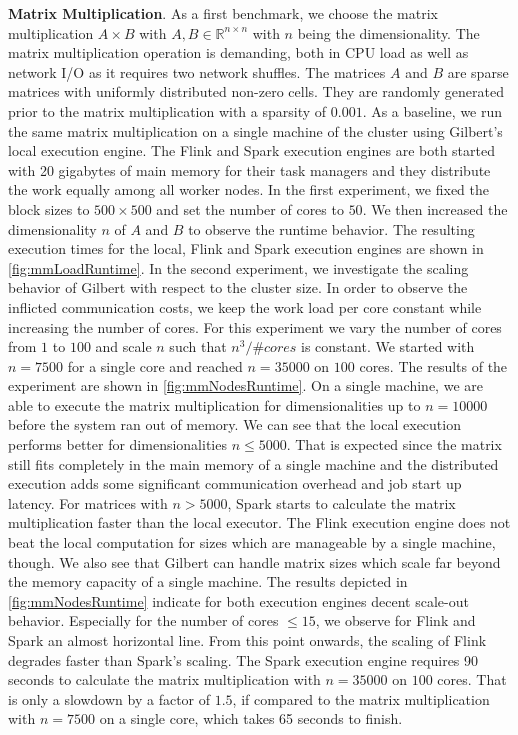 \textbf{Matrix Multiplication}. As a first benchmark, we choose the matrix multiplication $A\times B$ with $A,B \in \mathbb{R}^{n\times n}$ with $n$ being the dimensionality. The matrix multiplication operation is demanding, both in CPU load as well as network I/O as it requires two network shuffles. The matrices $A$ and $B$ are sparse matrices with uniformly distributed non-zero cells. They are randomly generated prior to the matrix multiplication with a sparsity of $0.001$. As a baseline, we run the same matrix multiplication on a single machine of the cluster using Gilbert's local execution engine. The Flink and Spark execution engines are both started with 20 gigabytes of main memory for their task managers and they distribute the work equally among all worker nodes. In the first experiment, we fixed the block sizes to $500 \times 500$ and set the number of cores to $50$. We then increased the dimensionality $n$ of $A$ and $B$ to observe the runtime behavior. The resulting execution times for the local, Flink and Spark execution engines are shown in \cref{fig:mmLoadRuntime}. In the second experiment, we investigate the scaling behavior of Gilbert with respect to the cluster size. In order to observe the inflicted communication costs, we keep the work load per core constant while increasing the number of cores. For this experiment we vary the number of cores from $1$ to $100$ and scale $n$ such that $n^3/\#cores$ is constant. We started with $n=7500$ for a single core and reached $n=35000$ on $100$ cores. The results of the experiment are shown in \cref{fig:mmNodesRuntime}. On a single machine, we are able to execute the matrix multiplication for dimensionalities up to $n=10000$ before the system ran out of memory. We can see that the local execution performs better for dimensionalities $n \le 5000$. That is expected since the matrix still fits completely in the main memory of a single machine and the distributed execution adds some significant communication overhead and job start up latency. For matrices with $n>5000$, Spark starts to calculate the matrix multiplication faster than the local executor. The Flink execution engine does not beat the local computation for sizes which are manageable by a single machine, though. We also see that Gilbert can handle matrix sizes which scale far beyond the memory capacity of a single machine. The results depicted in \cref{fig:mmNodesRuntime} indicate for both execution engines decent scale-out behavior. Especially for the number of cores $\le 15$, we observe for Flink and Spark an almost horizontal line. From this point onwards, the scaling of Flink degrades faster than Spark's scaling. The Spark execution engine requires 90 seconds to calculate the matrix multiplication with $n=35000$ on $100$ cores. That is only a slowdown by a factor of $1.5$, if compared to the matrix multiplication with $n=7500$ on a single core, which takes 65 seconds to finish.

